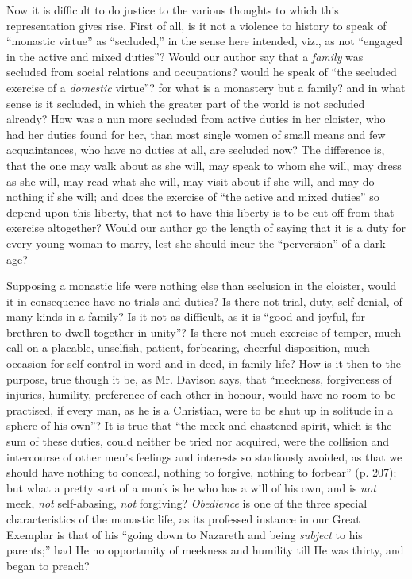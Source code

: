 Now it is difficult to do justice to the various
thoughts to which this representation gives rise. First of all, is it
not a violence to history to speak of ``monastic virtue'' as ``secluded,''
in the sense here intended, viz., as not ``engaged in the active and
mixed duties''? Would our author say that a \emph{family} was secluded
from social relations and occupations? would he speak of ``the secluded
exercise of a \emph{domestic} virtue''? for what is a monastery but a
family? and in what sense is it secluded, in which the greater part of
the world is not secluded already? How was a nun more secluded from
active duties in her cloister, who had her duties found for her, than
most single women of small means and few acquaintances, who have no
duties at all, are secluded now? The difference is, that the one may
walk about as she will, may speak to whom she will, may dress as she
will, may read what she will, may visit about if she will, and may do
nothing if she will; and does the exercise of ``the active and mixed
duties'' so depend upon this liberty, that not to have this liberty is
to be cut off from that exercise altogether? Would our author go the
length of saying that it is a duty for every young woman to marry,
lest she should incur the ``perversion'' of a dark age?

Supposing a monastic life were nothing else than
seclusion in the cloister, would it in consequence have no trials and
duties? Is there not trial, duty, self-denial, of many kinds in a
family? Is it not as difficult, as it is ``good and joyful, for
brethren to dwell together in unity''? Is there not much exercise of
temper, much call on a placable, unselfish, patient, forbearing,
cheerful disposition, much occasion for self-control in word and in
deed, in family life? How is it then to the purpose, true though it
be, as Mr. Davison says, that ``meekness, forgiveness of
injuries, humility, preference of each other in honour, would have no
room to be practised, if every man, as he is a Christian, were to be
shut up in solitude in a sphere of his own''? It is true that ``the meek
and chastened spirit, which is the sum of these duties, could neither
be tried nor acquired, were the collision and intercourse of other men's
feelings and interests so studiously avoided, as that we should have
nothing to conceal, nothing to forgive, nothing to forbear'' (p. 207);
but what a pretty sort of a monk is he who has a will of his own, and
is \emph{not} meek, \emph{not} self-abasing, \emph{not} forgiving? \emph{Obedience}
is one of the three special characteristics of the monastic life, as
its professed instance in our Great Exemplar is that of his ``going
down to Nazareth and being \emph{subject} to his parents;'' had He no
opportunity of meekness and humility till He was thirty, and began to
preach?


